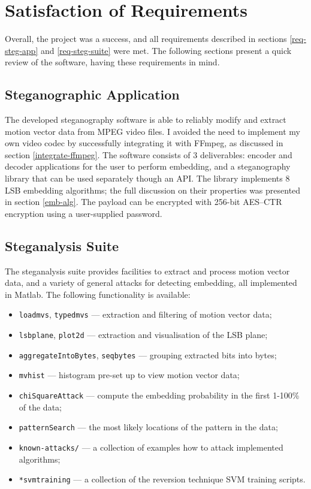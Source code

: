 \documentclass[12pt,british,twoside,notitlepage,usenames,dvipsnames,hypens,final]{report}
\numberwithin{equation}{section}
\numberwithin{figure}{section}
\begin{document}
\section{Satisfaction of Requirements}

Overall, the project was a success, and all requirements described in sections \ref{req-steg-app} and \ref{req-steg-suite} were met. The following sections present a quick review of the software, having these requirements in mind.

\subsection{Steganographic Application}

The developed steganography software is able to reliably modify and extract motion vector data from MPEG video files. I avoided the need to implement my own video codec by successfully integrating it with FFmpeg, as discussed in section \ref{integrate-ffmpeg}. The software consists of 3 deliverables: encoder and decoder applications for the user to perform embedding, and a steganography library that can be used separately though an API. The library implements 8 LSB embedding algorithms; the full discussion on their properties was presented in section \ref{emb-alg}. The payload can be encrypted with 256-bit AES--CTR encryption using a user-supplied password. 

\subsection{Steganalysis Suite}

The steganalysis suite provides facilities to extract and process motion vector data, and a variety of general attacks for detecting embedding, all implemented in Matlab. The following functionality is available:

\begin{multicols}{2}
\begin{itemize}
\item \texttt{loadmvs}, \texttt{typedmvs} --- extraction and filtering of motion vector data;
\item \texttt{lsbplane}, \texttt{plot2d} --- extraction and visualisation of the LSB plane;
\item \texttt{aggregateIntoBytes}, \texttt{seqbytes} --- grouping extracted bits into bytes;
\item \texttt{mvhist} --- histogram pre-set up to view motion vector data;
\item \texttt{chiSquareAttack} --- compute the embedding probability in the first 1-100\% of the data;
\item \texttt{patternSearch} --- the most likely locations of the pattern in the data;
\item \texttt{known-attacks/} --- a collection of examples how to attack implemented algorithms;
\item \texttt{*svmtraining} --- a collection of the reversion technique SVM training scripts.
\end{itemize}
\end{multicols}
\end{document}
